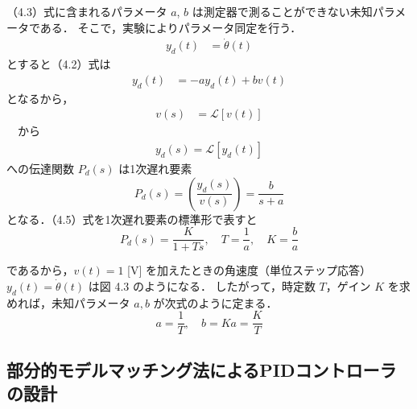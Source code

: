 （4.3）式に含まれるパラメータ $a$, $b$ は測定器で測ることができない未知パラメータである．
そこで，実験によりパラメータ同定を行う．
\begin{align}
  y_d(t) & = \dot{\theta}(t)
\end{align}とすると（4.2）式は    
\begin{align}                                                                    
  y_d(t) & = -a y_d(t) + b v(t) 
\end{align}となるから，    
\begin{align}                                                                             
  v(s) & = \mathcal{L}[v(t)]
\end{align}　から
\begin{align}  
  y_d(s) = \mathcal{L}[y_d(t)]
\end{align}への伝達関数 \(P_d(s)\) は1次遅れ要素
\begin{equation}
  P_d(s) = \left( \frac{y_d(s)}{v(s)} \right) = \frac{b}{s + a} \tag{4.5}
\end{equation}
となる．（4.5）式を1次遅れ要素の標準形で表すと
\begin{equation}
  P_d(s) = \frac{K}{1 + Ts}, \quad T = \frac{1}{a}, \quad K = \frac{b}{a} \tag{4.6}
\end{equation}

であるから，$v(t) = 1$ [V] を加えたときの角速度（単位ステップ応答） $y_d(t) = \dot{\theta}(t)$ は図 4.3 のようになる．
したがって，時定数 $T$，ゲイン $K$ を求めれば，未知パラメータ $a, b$ が次式のように定まる．
\begin{equation}
  a = \frac{1}{T}, \quad b = Ka = \frac{K}{T} \tag{4.7}
\end{equation}

\subsection{部分的モデルマッチング法によるPIDコントローラの設計}
